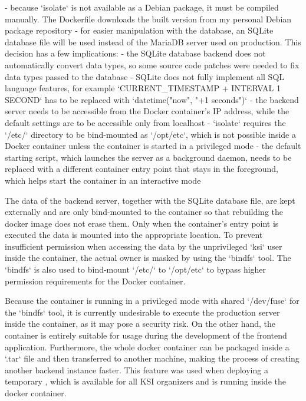 \documentclass[
  digital, %
  oneside, %
  lof,     %
  nolot,     %
]{fithesis4}
\begin{document}
{- because `isolate` is not available as a Debian package, it must be compiled manually. The Dockerfile downloads the built version from my personal Debian package repository
- for easier manipulation with the database, an SQLite database file will be used instead of the MariaDB server used on production. This decision has a few implications:
    - the SQLite database backend does not automatically convert data types, so some source code patches were needed to fix data types passed to the database
    - SQLite does not fully implement all SQL language features, for example `CURRENT_TIMESTAMP + INTERVAL 1 SECOND` has to be replaced with `datetime("now", "+1 seconds")`
- the backend server needs to be accessible from the Docker container's IP address, while the default settings are to be accessible only from localhost
- `isolate` requires the `/etc/` directory to be bind-mounted as `/opt/etc`, which is not possible inside a Docker container unless the container is started in a privileged mode
- the default starting script, which launches the server as a background daemon, needs to be replaced with a different container entry point that stays in the foreground, which helps start the container in an interactive mode

The data of the backend server, together with the SQLite database file, are kept externally and are only bind-mounted to the container so that rebuilding the docker image does not erase them. Only when the container's entry point is executed the data is mounted into the appropriate location. To prevent insufficient permission when accessing the data by the unprivileged `ksi` user inside the container, the actual owner is masked by using the `bindfs` tool. The `bindfs` is also used to bind-mount `/etc/` to `/opt/etc` to bypass higher permission requirements for the Docker container. 

Because the container is running in a privileged mode with shared `/dev/fuse` for the `bindfs` tool, it is currently undesirable to execute the production server inside the container, as it may pose a security risk. On the other hand, the container is entirely suitable for usage during the development of the frontend application. Furthermore, the whole docker container can be packaged inside a `.tar` file and then transferred to another machine, making the process of creating another backend instance faster. This feature was used when deploying a temporary , which is available for all KSI organizers and is running inside the docker container.

}
\end{document}
